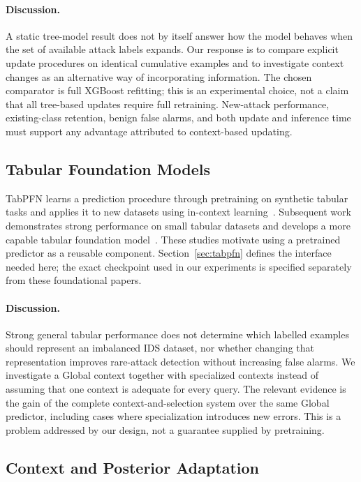 \documentclass[sigconf,anonymous,pbalance]{acmart}
\begin{document}
\paragraph{Discussion.}
A static tree-model result does not by itself answer how the model behaves when the set of available attack labels expands. Our response is to compare explicit update procedures on identical cumulative examples and to investigate context changes as an alternative way of incorporating information. The chosen comparator is full XGBoost refitting; this is an experimental choice, not a claim that all tree-based updates require full retraining. New-attack performance, existing-class retention, benign false alarms, and both update and inference time must support any advantage attributed to context-based updating.

\subsection{Tabular Foundation Models}
TabPFN learns a prediction procedure through pretraining on synthetic tabular tasks and applies it to new datasets using in-context learning~\cite{hollmann2023tabpfn}. Subsequent work demonstrates strong performance on small tabular datasets and develops a more capable tabular foundation model~\cite{hollmann2025tabpfn}. These studies motivate using a pretrained predictor as a reusable component. Section~\ref{sec:tabpfn} defines the interface needed here; the exact checkpoint used in our experiments is specified separately from these foundational papers.

\paragraph{Discussion.}
Strong general tabular performance does not determine which labelled examples should represent an imbalanced IDS dataset, nor whether changing that representation improves rare-attack detection without increasing false alarms. We investigate a Global context together with specialized contexts instead of assuming that one context is adequate for every query. The relevant evidence is the gain of the complete context-and-selection system over the same Global predictor, including cases where specialization introduces new errors. This is a problem addressed by our design, not a guarantee supplied by pretraining.

\subsection{Context and Posterior Adaptation}
\end{document}
